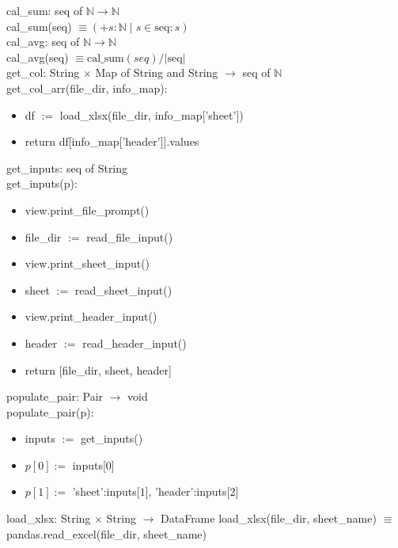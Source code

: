 \documentclass[12pt]{article}
\begin{document}
\noindent cal\_sum: seq of $\mathbb{N} \rightarrow \mathbb{N}$\\
cal\_sum(seq) $\equiv (+s:\mathbb{N} \; | \; s \in \text{seq} : s)$ \\

\noindent cal\_avg: seq of $\mathbb{N} \rightarrow \mathbb{N}$\\
cal\_avg(seq) $\equiv \text{cal\_sum}(seq) / |\text{seq}|$\\

\noindent get\_col: String $\times$ Map of String and String $\rightarrow$ seq of $\mathbb{N}$\\
get\_col\_arr(file\_dir, info\_map):
\begin{itemize}[\null]
  \item df $:=$ load\_xlsx(file\_dir, info\_map['sheet'])
  \item return df[info\_map['header']].values
\end{itemize}



\noindent get\_inputs: seq of String\\
get\_inputs(p): 
\begin{itemize}[\null]
  \item view.print\_file\_prompt()
  \item file\_dir $:=$ read\_file\_input()
  \item view.print\_sheet\_input()
  \item sheet $:=$ read\_sheet\_input()
  \item view.print\_header\_input()
  \item header $:=$ read\_header\_input()
  \item return [file\_dir, sheet, header]
\end{itemize}

\noindent populate\_pair: Pair $\rightarrow$ void\\
populate\_pair(p): 
\begin{itemize}[\null]
  \item inputs $:=$ get\_inputs()
  \item $p[0] :=$ inputs[$0$]
  \item $p[1] :=$ {'sheet':inputs[$1$], 'header':inputs[$2$]}
\end{itemize}

\noindent load\_xlsx: String $\times$ String $\rightarrow$ DataFrame
load\_xlsx(file\_dir, sheet\_name) $\equiv$ pandas.read\_excel(file\_dir, sheet\_name)
\end{document}
